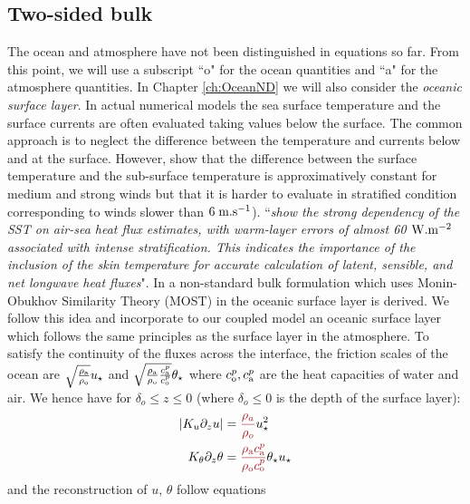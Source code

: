 \subsection{Two-sided bulk}
\label{sec:airseaSCM_twoSided}
The ocean and atmosphere have not been distinguished in equations
so far. From this point, we will use a subscript ``o" for the ocean
quantities and ``a" for the atmosphere quantities.
In Chapter \ref{ch:OceanND} we will also consider the
\textit{oceanic surface layer}.
In actual numerical models the sea surface temperature and the
surface currents are often
evaluated taking values below the surface. The common approach is
to neglect the difference between the temperature and currents
below and at the surface. However,
\citep{donlon_toward_2002} show that
the difference between
the surface temperature and the sub-surface temperature is
approximatively constant for medium and strong winds but that 
it is harder to evaluate in stratified condition corresponding
to winds slower than $6 \; {\rm m}.{\rm s}^{-1}$).
\citep{ward_near-surface_2006}
``\textit{show the strong dependency of the SST on air-sea heat
flux estimates, with warm-layer errors of almost
60 ${\rm W}.{\rm m}^{-2}$ associated with intense stratification. This indicates
the importance of the inclusion of the skin temperature for
accurate calculation of latent, sensible, and net longwave
heat fluxes}".
In \citep{pelletier_two-sided_2021} a non-standard bulk formulation
which uses Monin-Obukhov Similarity Theory (MOST) in the oceanic
surface layer is derived.
We follow this idea and incorporate to our coupled model an
oceanic surface layer which follows the same principles as
the surface layer in the atmosphere.
To satisfy the continuity of the fluxes across the interface,
the friction scales of the ocean are
$\sqrt{\frac{\rho_{\rm a}} {\rho_{\rm o}}} u_\star$ and
$\sqrt{\frac{\rho_{\rm a}}{\rho_{\rm o}}
\frac{c_{\rm a}^p}{c_{\rm o}^p}}
\theta_\star$ where $c_{\rm o}^p, c_{\rm a}^p$
are the heat capacities of water and air.
We hence have for $\delta_o \leq z \leq 0$ (where $\delta_o \leq 0$
is the depth of the surface layer):
\begin{equation}
	\begin{aligned}
	|K_u \partial_z u| &= \emphase{\frac{\rho_a}{\rho_o}}
	u_\star^2\\
	K_\theta \partial_z \theta &=
	\emphase{\frac{\rho_{\rm a} c_{\rm a}^p}
			{\rho_{\rm o} c_{\rm o}^p}}
	\theta_\star u_\star
	\end{aligned}
\end{equation}
and the reconstruction of $u$, $\theta$ follow equations
